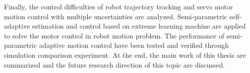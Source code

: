 \begin{englishabstract}
Finally, the control difficulties of robot trajectory tracking and servo motor motion control with multiple uncertainties are analyzed. Semi-parametric self-adaptive estimation and control based on extreme learning machine are applied to solve the motor control in robot motion problem. The performance of semi-parametric adaptive motion control have been tested and verified through simulation comparison experiment. At the end, the main work of this thesis are summarized and the future research direction of this topic are discussed.
   

\end{englishabstract}

